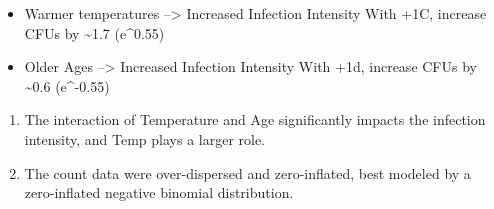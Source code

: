 \documentclass[
]{article}
\begin{document}
\begin{itemize}
\item
  Warmer temperatures --\textgreater{} Increased Infection Intensity
  With +1C, increase CFUs by \textasciitilde1.7 (e\^{}0.55)
\item
  Older Ages --\textgreater{} Increased Infection Intensity With +1d,
  increase CFUs by \textasciitilde0.6 (e\^{}-0.55)
\end{itemize}

\begin{enumerate}
\def\labelenumi{\arabic{enumi})}
\setcounter{enumi}{1}
\item
  The interaction of Temperature and Age significantly impacts the
  infection intensity, and Temp plays a larger role.
\item
  The count data were over-dispersed and zero-inflated, best modeled by
  a zero-inflated negative binomial distribution.
\end{enumerate}
\end{document}
